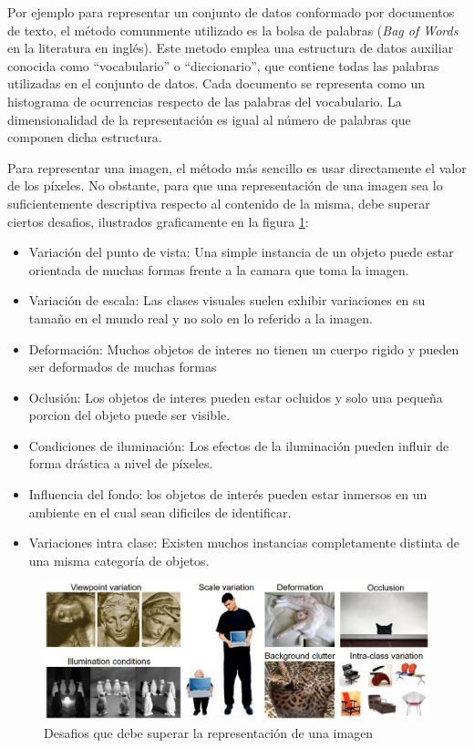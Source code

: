 \documentclass[a4paper,11pt,spanish]{book}
\begin{document}
      Por ejemplo para representar un conjunto de datos conformado por documentos de texto, el método comunmente utilizado es la bolsa de palabras (\emph{Bag of Words} en la literatura en inglés). 
      Este metodo emplea una estructura de datos auxiliar conocida como ``vocabulario'' o ``diccionario'', que contiene todas las palabras utilizadas en el conjunto de datos. 
      Cada documento se representa como un histograma de ocurrencias respecto de las palabras del vocabulario. 
      La dimensionalidad de la representación es igual al número de palabras que componen dicha estructura.

      Para representar una imagen, el método más sencillo es usar directamente el valor de los píxeles. No obstante, para que una representación de una imagen sea lo suficientemente
      descriptiva respecto al contenido de la misma, debe superar ciertos desafios, ilustrados graficamente en la figura \ref{fig:stanford_challenges}:
      \begin{itemize}
	\item Variación del punto de vista: Una simple instancia de un objeto puede estar orientada de muchas formas frente a la camara que toma la imagen.
	\item Variación de escala: Las clases visuales suelen exhibir variaciones en su tamaño en el mundo real y no solo en lo referido a la imagen.
	\item Deformación: Muchos objetos de interes no tienen un cuerpo rigido y pueden ser deformados de muchas formas
	\item Oclusión: Los objetos de interes pueden estar ocluidos y solo una pequeña porcion del objeto puede ser visible.
	\item Condiciones de iluminación: Los efectos de la iluminación pueden influir de forma drástica a nivel de píxeles.
	\item Influencia del fondo: los objetos de interés pueden estar inmersos en un ambiente en el cual sean dificiles de identificar.
	\item Variaciones intra clase: Existen muchos instancias completamente distinta de una misma categoría de objetos.
      \end{itemize}
      
      \begin{figure}[h]
	\includegraphics[scale=0.5]{./img/stanford_challenges.jpeg}
	\caption{Desafios que debe superar la representación de una imagen}
	\label{fig:stanford_challenges}
      \end{figure}
\end{document}
